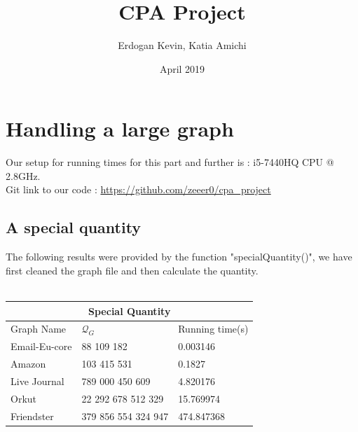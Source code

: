 \documentclass{article}
\title{CPA Project}
\author{Erdogan Kevin, Katia Amichi}
\date{April 2019}
\begin{document}
\maketitle

\section{Handling a large graph}
Our setup for running times for this part and further is :
i5-7440HQ CPU @ 2.8GHz. \\
Git link to our code : \url{https://github.com/zeeer0/cpa_project}
\subsection{A special quantity}
The following results were provided by the function "specialQuantity()", we have first cleaned the graph file and then calculate the quantity.\\ \\
\begin{tabular}{ |p{3.7cm}||p{3.7cm}|p{3.7cm}|  }
 \hline
 \multicolumn{3}{|c|}{ Special Quantity } \\
 \hline
 Graph Name & $\mathcal{Q}_G$ & Running time(s)\\
 \hline
 Email-Eu-core & 88 109 182 & 0.003146\\
 Amazon & 103 415 531  & 0.1827 \\
 Live Journal & 789 000 450 609 & 4.820176\\
 Orkut & 22 292 678 512 329 & 15.769974\\
 Friendster & 379 856 554 324 947 & 474.847368\\
 \hline
\end{tabular}

\clearpage
\end{document}
